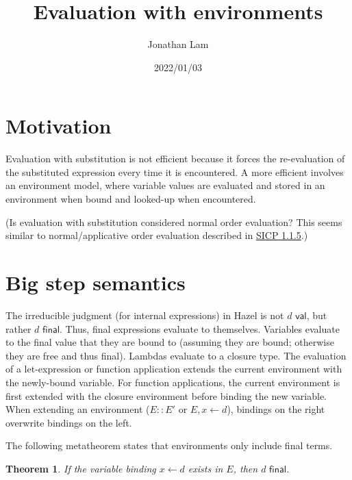 \documentclass{article}
\title{Evaluation with environments}
\author{Jonathan Lam}
\date{2022/01/03}
\newtheorem{theorem}{Theorem}
\begin{document}
\maketitle{}

\section{Motivation}

Evaluation with substitution is not efficient because it forces the re-evaluation of the substituted expression every time it is encountered. A more efficient involves an environment model, where variable values are evaluated and stored in an environment when bound and looked-up when encountered.

(Is evaluation with substitution considered normal order evaluation? This seems similar to normal/applicative order evaluation described in \href{https://mitpress.mit.edu/sites/default/files/sicp/full-text/book/book-Z-H-10.html#%_sec_1.1.5}{SICP 1.1.5}.)

\section*{Big step semantics}

The irreducible judgment (for internal expressions) in Hazel is not $d\textsf{ val}$, but rather $d\textsf{ final}$. Thus, final expressions evaluate to themselves. Variables evaluate to the final value that they are bound to (assuming they are bound; otherwise they are free and thus final). Lambdas evaluate to a closure type. The evaluation of a let-expression or function application extends the current environment with the newly-bound variable. For function applications, the current environment is first extended with the closure environment before binding the new variable. When extending an environment ($E::E'$ or $E,x\leftarrow d$), bindings on the right overwrite bindings on the left. \\


The following metatheorem states that environments only include final terms.
\begin{theorem}
  If the variable binding $x\leftarrow d$ exists in $E$, then $d\textsf{ final}$.
\end{theorem}
\end{document}
